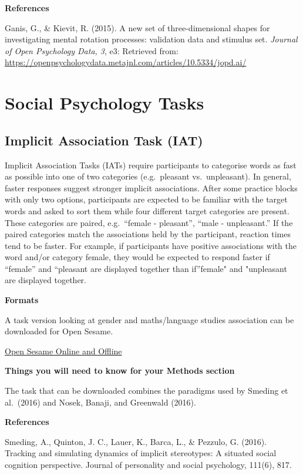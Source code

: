 \documentclass[
]{book}
\begin{document}
\textbf{References}

Ganis, G., \& Kievit, R. (2015). A new set of three-dimensional shapes for investigating mental rotation processes: validation data and stimulus set. \emph{Journal of Open Psychology Data, 3}, e3: Retrieved from: \url{https://openpsychologydata.metajnl.com/articles/10.5334/jopd.ai/}

\hypertarget{social-psychology-tasks}{%
\chapter{Social Psychology Tasks}\label{social-psychology-tasks}}

\hypertarget{implicit-association-task-iat}{%
\section{Implicit Association Task (IAT)}\label{implicit-association-task-iat}}

Implicit Association Tasks (IATs) require participants to categorise words as fast as possible into one of two categories (e.g.~pleasant vs.~unpleasant). In general, faster responses suggest stronger implicit associations. After some practice blocks with only two options, participants are expected to be familiar with the target words and asked to sort them while four different target categories are present. These categories are paired, e.g.~``female - pleasant'', ``male - unpleasant.'' If the paired categories match the associations held by the participant, reaction times tend to be faster. For example, if participants have positive associations with the word and/or category female, they would be expected to respond faster if ``female'' and ``pleasant are displayed together than if''female" and "unpleasant are displayed together.

\textbf{Formats}

A task version looking at gender and maths/language studies association can be downloaded for Open Sesame.

\href{link\%20here}{Open Sesame Online and Offline}

\textbf{Things you will need to know for your Methods section}

The task that can be downloaded combines the paradigms used by Smeding et al.~(2016) and Nosek, Banaji, and Greenwald (2016).

\textbf{References}

Smeding, A., Quinton, J. C., Lauer, K., Barca, L., \& Pezzulo, G. (2016). Tracking and simulating dynamics of implicit stereotypes: A situated social cognition perspective. Journal of personality and social psychology, 111(6), 817.
\end{document}
